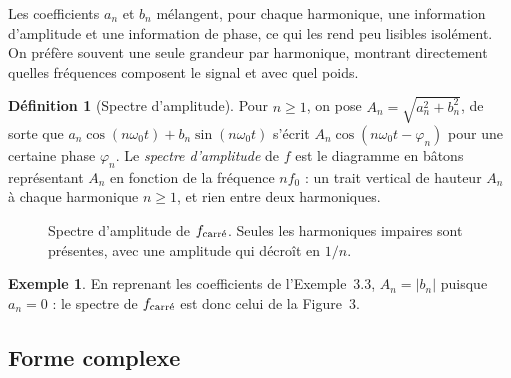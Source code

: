 \documentclass[a4paper,11pt]{article}
\theoremstyle{definition}
\newtheorem{definition}{Définition}[section]
\newtheorem{exemple}{Exemple}[section]
\newcommand{\highlight}[1]{{\color{niceblue}\emph{#1}}}
\begin{document}
Les coefficients $a_n$ et $b_n$ mélangent, pour chaque harmonique, une information d'amplitude et une information de phase, ce qui les rend peu lisibles isolément. On préfère souvent une seule grandeur par harmonique, montrant directement quelles fréquences composent le signal et avec quel poids.

\begin{definition}[Spectre d'amplitude]
    Pour $n\geq1$, on pose $A_n = \sqrt{a_n^2+b_n^2}$, de sorte que $a_n\cos(n\omega_0 t) + b_n\sin(n\omega_0 t)$ s'écrit $A_n\cos(n\omega_0 t - \varphi_n)$ pour une certaine phase $\varphi_n$. Le \highlight{spectre d'amplitude} de $f$ est le diagramme en bâtons représentant $A_n$ en fonction de la fréquence $nf_0$ : un trait vertical de hauteur $A_n$ à chaque harmonique $n\geq1$, et rien entre deux harmoniques.
\end{definition}

\begin{figure}[h]
    \centering
    \caption{Spectre d'amplitude de $f_{\rm carr\acute{e}}$. Seules les harmoniques impaires sont présentes, avec une amplitude qui décroît en $1/n$.}
\end{figure}

\begin{exemple}
    En reprenant les coefficients de l'Exemple~3.3, $A_n=|b_n|$ puisque $a_n=0$ : le spectre de $f_{\rm carr\acute{e}}$ est donc celui de la Figure~3.
\end{exemple}


\subsection{Forme complexe}
\end{document}
